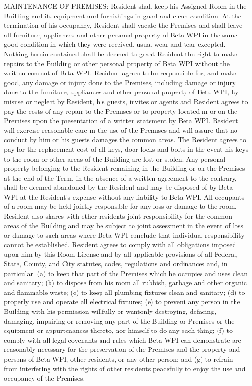 \documentclass[12pt]{article}
\begin{document}
\begin{enumerate}
MAINTENANCE OF PREMISES\@: Resident shall keep his Assigned Room in the Building and its equipment and furnishings in good and clean condition.
At the termination of his occupancy, Resident shall vacate the Premises and shall leave all furniture, appliances and other personal property of Beta WPI in the same good condition in which they were received, usual wear and tear excepted.
Nothing herein contained shall be deemed to grant Resident the right to make repairs to the Building or other personal property of Beta WPI without the written consent of Beta WPI\@.
Resident agrees to be responsible for, and make good, any damage or injury done to the Premises, including damage or injury done to the furniture, appliances and other personal property of Beta WPI, by misuse or neglect by Resident, his guests, invites or agents and Resident agrees to pay the costs of any repair to the Premises or to property located in or on the Premises upon the presentation of a written statement by Beta WPI\@.
Resident will exercise reasonable care in the use of the Premises and will assure that no conduct by him or his guests damages the common areas.
The Resident agrees to pay for the replacement cost of all keys, door locks and bolts in the event his keys to the room or other areas of the Building are lost or stolen.
Any personal property belonging to the Resident remaining in the Building or on the Premises at the end of the Term, in the absence of a written agreement to the contrary, shall be deemed abandoned by the Resident and may be disposed of by Beta WPI at the Resident’s expense without any liability to Beta WPI\@.
All occupants of a room may be held jointly responsible for any loss or damage to the room.
Resident also shares with other residents joint responsibility for the common areas of the Building and may be subject to joint assessment in the event of loss or damage to such areas where Beta WPI conclude that individual responsibility cannot be established.
Resident agrees to comply with all obligations imposed upon him by this Room License and by all applicable provisions of all Federal, State, County, and City statutes, codes, regulations and ordinances and, in particular: (a) to keep that part of the Premises which he occupies and uses clean and sanitary; (b) to dispose from his room all rubbish, garbage and other organic and flammable waste; (c) to keep all plumbing fixtures clean and sanitary; (d) to properly use and operate all electrical fixtures; (e) to prevent any person in the Building with his permission willfully or wantonly destroying, defacing, damaging, impairing or removing any part of the Building or Premises or the equipment or appurtenances thereto, nor himself to do any such thing; (f) to comply with all legal covenants and rules which Beta WPI can demonstrate are reasonably necessary for the preservation of the Premises and the property and persons of Beta WPI, other residents, or any other person; and (g) to refrain from interfering with the rights of other residents peacefully to enjoy the use and occupancy of the Premises.


\end{enumerate}
\end{document}
